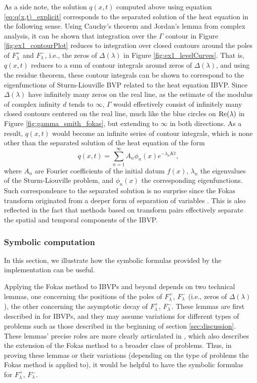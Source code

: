 \documentclass[12pt, oneside, a4paper]{article}
\begin{document}
As a side note, the solution $q(x,t)$ computed above using equation \eqref{eq:q(x,t)_explicit} corresponds to the separated solution of the heat equation \cite{Pinsky1991} in the following sense. Using Cauchy's theorem and Jordan's lemma from complex analysis, it can be shown that integration over the $\Gamma$ contour in Figure \ref{fig:ex1_contourPlot} reduces to integration over closed contours around the poles of $F^+_\lambda$ and $F^-_\lambda$, i.e., the zeros of $\Delta(\lambda)$ in Figure \ref{fig:ex1_levelCurves}. That is, $q(x,t)$ reduces to a sum of contour integrals around zeros of $\Delta(\lambda)$, and using the residue theorem, these contour integrals can be shown to correspond to the eigenfunctions of Sturm-Liouville BVP related to the heat equation IBVP. Since $\Delta(\lambda)$ have infinitely many zeros on the real line, as the estimate of the modulus of complex infinity $d$ tends to $\infty$, $\Gamma$ would effectively consist of infinitely many closed contours centered on the real line, much like the blue circles on $\mathrm{Re}(\lambda)$ in Figure \ref{fig:gamma_smith_fokas}, but extending to $\infty$ in both directions. As a result, $q(x,t)$ would become an infinite series of contour integrals, which is none other than the separated solution of the heat equation of the form 
\[q(x,t) = \sum_{n=1}^\infty A_n \phi_n(x)e^{-\lambda_n Kt},\]
where $A_n$ are Fourier coefficients of the initial datum $f(x)$, $\lambda_n$ the eigenvalues of the Sturm-Liouville problem, and $\phi_n(x)$ the corresponding eigenfunctions. Such correspondence to the separated solution is no surprise since the Fokas transform originated from a deeper form of separation of variables \cite{Fokas2009}. This is also reflected in the fact that methods based on transform pairs effectively separate the spatial and temporal components of the IBVP.

\subsubsection{Symbolic computation}\label{sec:symbolic_computation}

In this section, we illustrate how the symbolic formulas provided by the implementation can be useful.

Applying the Fokas method to IBVPs and beyond depends on two technical lemmas, one concerning the positions of the poles of $F^+_\lambda$, $F^-_\lambda$ (i.e., zeros of $\Delta(\lambda)$), the other concerning the asymptotic decay of $F^+_\lambda$, $F^-_\lambda$. These lemmas are first described in \cite{Smith2012} for IBVPs, and they may assume variations for different types of problems such as those described in the beginning of section \ref{sec:discussion}. These lemmas' precise roles are more clearly articulated in \cite{Miller2018}, which also describes the extension of the Fokas method to a broader class of problems. Thus, in proving these lemmas or their variations (depending on the type of problems the Fokas method is applied to), it would be helpful to have the symbolic formulas for $F^+_\lambda$, $F^-_\lambda$.
\end{document}
